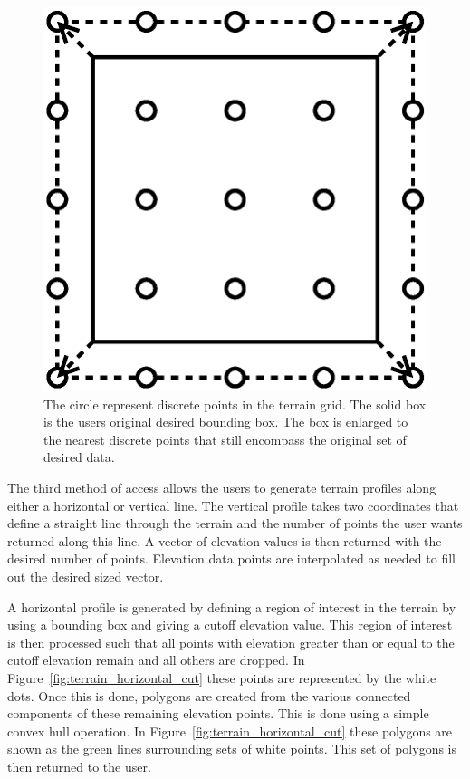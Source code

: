 \begin{figure}[ht]
\centering
\includegraphics{images/network_vis/terrain_bounding_box.eps}
  \caption{The circle represent discrete points in the terrain grid.  The solid box is the users original desired bounding box.  The box is enlarged to the nearest discrete points that still encompass the original set of desired data.}
\label{fig:terrain_bb}
\end{figure}

The third method of access allows the users to generate terrain profiles along either a horizontal or vertical line.  The vertical profile takes two coordinates that define a straight line through the terrain and the number of points the user wants returned along this line.  A vector of elevation values is then returned with the desired number of points.  Elevation data points are interpolated as needed to fill out the desired sized vector.  

A horizontal profile is generated by defining a region of interest in the terrain by using a bounding box and giving a cutoff elevation value.  This region of interest is then processed such that all points with elevation greater than or equal to the cutoff elevation remain and all others are dropped.  In Figure~\ref{fig:terrain_horizontal_cut} these points are represented by the white dots.  Once this is done, polygons are created from the various connected components of these remaining elevation points.  This is done using a simple convex hull operation.  In Figure~\ref{fig:terrain_horizontal_cut} these polygons are shown as the green lines surrounding sets of white points.  This set of polygons is then returned to the user.

